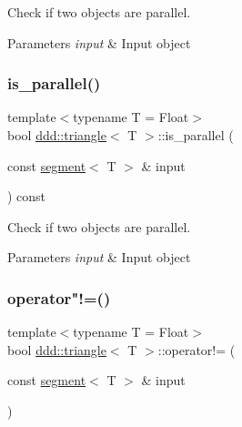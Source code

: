 Check if two objects are parallel. 


\begin{DoxyParams}{Parameters}
{\em input} & Input object \\
\hline
\end{DoxyParams}
\mbox{\label{classddd_1_1triangle_a7f8fcee75b7b053c7f62bbf7cdc759cb}} 
\subsubsection{\texorpdfstring{is\+\_\+parallel()}{is\_parallel()}\hspace{0.1cm}{\footnotesize\ttfamily [5/5]}}
{\footnotesize\ttfamily template$<$typename T = Float$>$ \\
bool \hyperlink{classddd_1_1triangle}{ddd\+::triangle}$<$ T $>$\+::is\+\_\+parallel (\begin{DoxyParamCaption}\item[{const \hyperlink{classddd_1_1segment}{segment}$<$ T $>$ \&}]{input }\end{DoxyParamCaption}) const\hspace{0.3cm}{\ttfamily [inline]}}



Check if two objects are parallel. 


\begin{DoxyParams}{Parameters}
{\em input} & Input object \\
\hline
\end{DoxyParams}
\mbox{\label{classddd_1_1triangle_af23c4691bc10de121a1873d4740068fd}} 
\subsubsection{\texorpdfstring{operator"!=()}{operator!=()}}
{\footnotesize\ttfamily template$<$typename T = Float$>$ \\
bool \hyperlink{classddd_1_1triangle}{ddd\+::triangle}$<$ T $>$\+::operator!= (\begin{DoxyParamCaption}\item[{const \hyperlink{classddd_1_1segment}{segment}$<$ T $>$ \&}]{input }\end{DoxyParamCaption})\hspace{0.3cm}{\ttfamily [inline]}}



